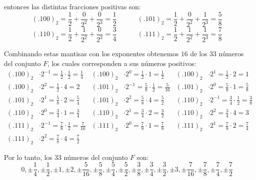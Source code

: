 \documentclass[letterpaper,11pt]{article}
\begin{document}
\begin{enumerate}
    entonces las distintas fracciones positivas son: 
    \begin{equation*}
        (.100)_2 
        = \frac{1}{2} + \frac{0}{2^2} + \frac{0}{2^3}
        = \frac{1}{2} \quad \quad \quad
        (.101)_2
        = \frac{1}{2} + \frac{0}{2^2} + \frac{1}{2^3}
        = \frac{5}{8}
    \end{equation*}
    \begin{equation*}
        (.110)_2
        = \frac{1}{2} + \frac{1}{2^2} + \frac{0}{2^3}
        = \frac{3}{4} \quad  \quad \quad 
        (.111)_2
        = \frac{1}{2} + \frac{1}{2^2} + \frac{1}{2^3}
        = \frac{7}{8}
    \end{equation*}

    Combinando estas mantisas con los exponentes obtenemos $16$ de los 
    $33$ números del conjunto $F$, los cuales corresponden a sus números 
    positivos:
    \begin{align*}
        (.100)_2 &\cdot 2^{-1} = \frac{1}{2} \cdot \frac{1}{2} = 
        \frac{1}{4} 
        & (.100)_2 &\cdot 2^0 = \frac{1}{2} \cdot 1 = \frac{1}{2}              
        &  (.100)_2 &\cdot 2^1 = \frac{1}{2} \cdot 2 = 1 \\
        (.100)_2 &\cdot 2^2 = \frac{1}{2} \cdot 4 = 2 
        & (.101)_2 &\cdot 2^{-1} = \frac{5}{8} \cdot \frac{1}{2} = 
        \frac{5}{16}  
        & (.101)_2 &\cdot 2^0 = \frac{5}{8} \cdot 1 = \frac{5}{8} \\
        (.101)_2 &\cdot 2^1 = \frac{5}{8} \cdot 2 = \frac{5}{4}
        & (.101)_2 &\cdot 2^2 = \frac{5}{8} \cdot 4 = \frac{5}{2} 
        & (.110)_2 &\cdot 2^{-1} = \frac{3}{4} \cdot \frac{1}{2} = 
        \frac{3}{8} \\
        (.110)_2 &\cdot 2^0 = \frac{3}{4} \cdot 1 = \frac{3}{4} 
        & (.110)_2 &\cdot 2^1 = \frac{3}{4} \cdot 2 = \frac{3}{2} 
        & (.110)_2 &\cdot 2^2 = \frac{3}{4} \cdot 4 = 3 \\
        (.111)_2 &\cdot 2^{-1} = \frac{7}{8} \cdot \frac{1}{2} 
        = \frac{7}{16} 
        & (.111)_2 &\cdot 2^0 = \frac{7}{8} \cdot 1 = \frac{7}{8} 
        & (.111)_2 &\cdot 2^1 = \frac{7}{8} \cdot 2 = \frac{7}{4} \\ 
        (.111)_2 &\cdot 2^2 = \frac{7}{8} \cdot 4 = \frac{7}{2}
    \end{align*}

    Por lo tanto, los $33$ números del conjunto $F$ son:
    \begin{equation*}
        0, \pm \frac{1}{4}, \pm \frac{1}{2}, \pm 1, \pm 2, \pm \frac{5}{16},
        \pm \frac{5}{8}, \pm \frac{5}{4}, \pm \frac{5}{2}, \pm \frac{3}{8}, 
        \pm \frac{3}{4}, \pm \frac{3}{2}, \pm 3, \pm \frac{7}{16}, 
        \pm \frac{7}{8}, \pm \frac{7}{4}, \pm \frac{7}{2}
    \end{equation*}
    

\end{enumerate}
\end{document}

